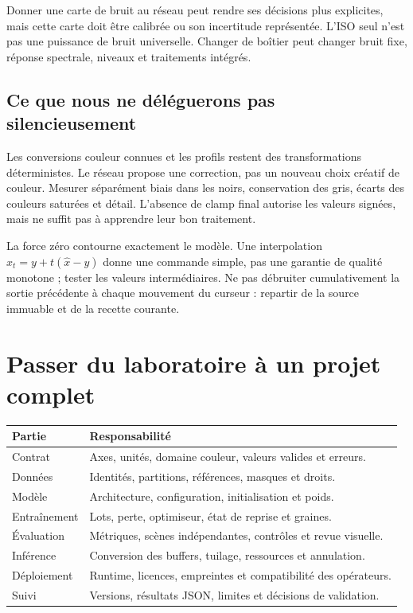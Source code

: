 \documentclass[12pt,a4paper,oneside]{report}
\begin{document}
Donner une carte de bruit au réseau peut rendre ses décisions plus explicites,
mais cette carte doit être calibrée ou son incertitude représentée. L'ISO seul
n'est pas une puissance de bruit universelle. Changer de boîtier peut changer
bruit fixe, réponse spectrale, niveaux et traitements intégrés.

\section{Ce que nous ne déléguerons pas silencieusement}

Les conversions couleur connues et les profils restent des transformations
déterministes. Le réseau propose une correction, pas un nouveau choix créatif
de couleur. Mesurer séparément biais dans les noirs, conservation des gris,
écarts des couleurs saturées et détail. L'absence de clamp final autorise
les valeurs signées, mais ne suffit pas à apprendre leur bon traitement.

La force zéro contourne exactement le modèle. Une interpolation
$x_t=y+t(\hat x-y)$ donne une commande simple, pas une garantie de qualité
monotone ; tester les valeurs intermédiaires. Ne pas débruiter cumulativement
la sortie précédente à chaque mouvement du curseur : repartir de la source
immuable et de la recette courante.

\chapter{Passer du laboratoire à un projet complet}

\begin{longtable}{p{}p{}}
\toprule Partie & Responsabilité \\ \midrule
Contrat & Axes, unités, domaine couleur, valeurs valides et erreurs.\\
Données & Identités, partitions, références, masques et droits.\\
Modèle & Architecture, configuration, initialisation et poids.\\
Entraînement & Lots, perte, optimiseur, état de reprise et graines.\\
Évaluation & Métriques, scènes indépendantes, contrôles et revue visuelle.\\
Inférence & Conversion des buffers, tuilage, ressources et annulation.\\
Déploiement & Runtime, licences, empreintes et compatibilité des opérateurs.\\
Suivi & Versions, résultats JSON, limites et décisions de validation.\\
\bottomrule
\end{longtable}
\end{document}
